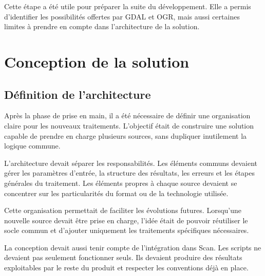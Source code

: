 Cette étape a été utile pour préparer la suite du développement. Elle a permis
d'identifier les possibilités offertes par GDAL et OGR, mais aussi certaines
limites à prendre en compte dans l'architecture de la solution.



\section{Conception de la solution}
\label{sec:conception_solution}


\subsection{Définition de l'architecture}
\label{subsec:def_architecture}

Après la phase de prise en main, il a été nécessaire de définir une organisation
claire pour les nouveaux traitements. L'objectif était de construire une
solution capable de prendre en charge plusieurs sources, sans dupliquer
inutilement la logique commune.

L'architecture devait séparer les responsabilités. Les éléments communs
devaient gérer les paramètres d'entrée, la structure des résultats, les erreurs
et les étapes générales du traitement. Les éléments propres à chaque source
devaient se concentrer sur les particularités du format ou de la technologie
utilisée.

Cette organisation permettait de faciliter les évolutions futures. Lorsqu'une
nouvelle source devait être prise en charge, l'idée était de pouvoir réutiliser
le socle commun et d'ajouter uniquement les traitements spécifiques nécessaires.

La conception devait aussi tenir compte de l'intégration dans Scan. Les scripts
ne devaient pas seulement fonctionner seuls. Ils devaient produire des résultats
exploitables par le reste du produit et respecter les conventions déjà en place.

